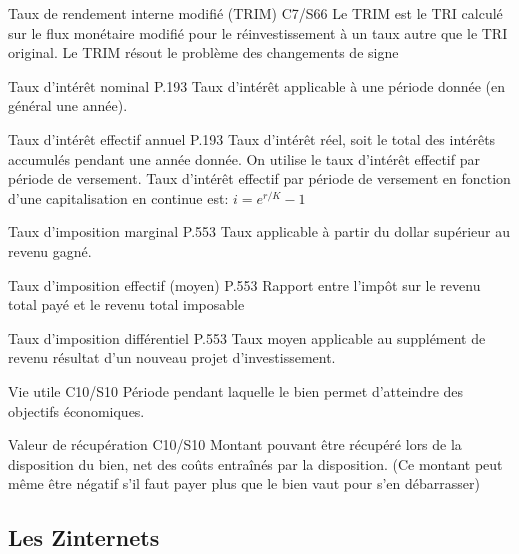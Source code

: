 {\entry
{Taux de rendement interne modifié (TRIM)}
{C7/S66}
{Le TRIM est le TRI calculé sur le flux monétaire modifié pour le réinvestissement à un taux autre que le TRI original. Le TRIM résout le problème des changements de signe}

\entry
{Taux d'intérêt nominal}
{P.193}
{Taux d'intérêt applicable à une période donnée (en général une année).}

\entry
{Taux d'intérêt effectif annuel}
{P.193}
{Taux d'intérêt réel, soit le total des intérêts accumulés pendant une année donnée. On utilise le taux d'intérêt effectif par période de versement. Taux d'intérêt effectif par période de versement en fonction d'une capitalisation en continue est: $i=e^{r/K}-1$}

\entry
{Taux d'imposition marginal}
{P.553}
{Taux applicable à partir du dollar supérieur au revenu gagné.}

\entry
{Taux d'imposition effectif (moyen)}
{P.553}
{Rapport entre l'impôt sur le revenu total payé et le revenu total imposable}

\entry
{Taux d'imposition différentiel}
{P.553}
{Taux moyen applicable au supplément de revenu résultat d'un nouveau projet d'investissement.}

\entry
{Vie utile}
{C10/S10}
{Période pendant laquelle le bien permet d’atteindre des objectifs économiques.}

\entry
{Valeur de récupération}
{C10/S10}
{Montant pouvant être récupéré lors de la disposition du bien, net des coûts entraînés par la disposition. (Ce montant peut même être négatif s’il faut payer plus que le bien vaut pour s’en débarrasser)}


\subsection{Les Zinternets}




}
